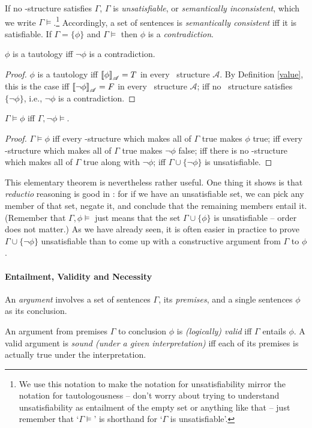 If no \lone-structure satisfies $\Gamma$,  $\Gamma$ is \emph{unsatisfiable}, or \emph{semantically inconsistent}, which we write $\Gamma\vDash$.\footnote{We use this notation to make the notation for unsatisfiability mirror the notation for tautologousness – don't worry about trying to understand unsatisfiability as entailment of the empty set or anything like that – just remember that `$\Gamma \vDash$' is shorthand for `$\Gamma$ is unsatisfiable'.} Accordingly, a set of sentences is \emph{semantically consistent} iff it is satisfiable. If $\Gamma = \{\phi\}$ and $\Gamma \vDash$ then $\phi$ is a \emph{contradiction}.
\begin{theorem}
	$\phi$ is a tautology iff $\neg\phi$ is a contradiction.
	\begin{proof}
		$\phi$ is a tautology iff $\left\llbracket \phi\right\rrbracket_{\mathscr{A}} =T$ in every \lone\ structure $\mathscr{A}$. By Definition \ref{value}, this is the case iff $\left\llbracket \neg\phi\right\rrbracket_{\mathscr{A}}=F$ in every \lone\ structure $\mathscr{A}$; iff no \lone\ structure satisfies $\{\neg\phi\}$, i.e., $\neg\phi$ is a contradiction. 
	\end{proof}
\end{theorem}

\begin{theorem}\label{entuns}
	$\Gamma\vDash\phi$ iff $\Gamma,¬\phi\vDash$.
	\begin{proof}
		$\Gamma\vDash \phi$ iff every \lone-structure which makes all of $\Gamma$ true makes $\phi$ true; iff every \lone-structure which makes all of $\Gamma$ true makes $¬\phi$ false; iff there is no \lone-structure which makes all of $\Gamma$ true along with $¬\phi$; iff $\Gamma\cup\{¬\phi\}$ is unsatisfiable.
	\end{proof}
\end{theorem}
This elementary theorem is nevertheless rather useful. One thing it shows is that \emph{reductio} reasoning is good in \lone: for if we have an unsatisfiable set, we can pick any member of that set, negate it,  and conclude that the remaining members entail it. (Remember that $\Gamma,\phi\vDash$ just means that the set $\Gamma\cup\{\phi\}$ is unsatisfiable – order does not matter.) As we have already seen, it is often easier in practice to prove $\Gamma\cup\{¬\phi\}$ unsatisfiable than to come up with a constructive argument from $\Gamma$ to $\phi$.


\paragraph{Entailment, Validity and Necessity}An \emph{argument} involves a set of sentences $\Gamma$, its \emph{premises}, and a single sentences $\phi$ as its conclusion.
 \begin{definition}
 	An argument from premises $\Gamma$ to conclusion $\phi$ is \emph{(logically) valid} iff  $\Gamma$  entails $\phi$. A valid argument is \emph{sound (under a given interpretation)} iff each of its premises is actually true under the interpretation.
 \end{definition} 

